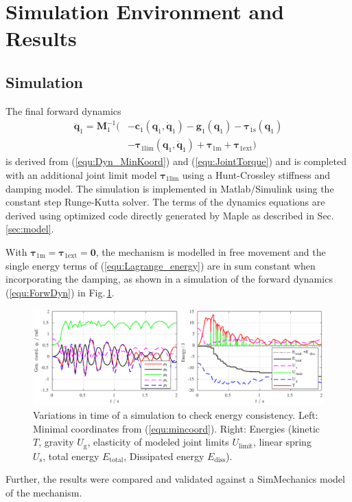 \documentclass[letterpaper, 10 pt, conference]{ieeeconf}  %
\newcommand{\bm}[1]{\boldsymbol{#1}}
\begin{document}
\section{Simulation Environment and Results}
\label{sec:simulation}

\subsection{Simulation}

The final forward dynamics
\begin{align}
\ddot{\bm{q}}_1 = \bm{M}_1^{-1}( &-\bm{c}_1(\bm{q}_1,\dot{\bm{q}}_1)-\bm{g}_1(\bm{q}_1) -\bm{\tau}_{1\mathrm{s}}(\bm{q}_1) \nonumber \\
& - \bm{\tau}_{1\mathrm{lim}}(\bm{q}_1,\dot{\bm{q}}_1)  + \bm{\tau}_{1\mathrm{m}} + \bm{\tau}_{1\mathrm{ext}})
\label{equ:ForwDyn}
\end{align}
is derived from (\ref{equ:Dyn_MinKoord}) and (\ref{equ:JointTorque}) and is completed with an additional joint limit model $\bm{\tau}_{1\mathrm{lim}}$ using a Hunt-Crossley stiffness and damping model.
The simulation is implemented in Matlab/Simulink using the constant step Runge-Kutta solver.
The terms of the dynamics equations are derived using optimized code directly generated by Maple as described in Sec.\,\ref{sec:model}.

With ${\bm{\tau}_{1\mathrm{m}} = \bm{\tau}_{1\mathrm{ext}} = \bm{0}}$, the mechanism is modelled in free movement and the single energy terms of (\ref{equ:Lagrange_energy}) are in sum constant when incorporating the damping, as shown in a simulation of the forward dynamics (\ref{equ:ForwDyn}) in Fig.\,\ref{fig:SimulationEnergiekonsistenz}.
%
\begin{figure}[htb!]
    \includegraphics{figures/KAS5m5_Gelenkgrenzmodell_q_E.pdf} 
    \vspace{-0.4cm}
    \caption{Variations in time of a simulation to check energy consistency. Left: Minimal coordinates from (\ref{equ:mincoord}). Right: Energies (kinetic $T$, gravity $U_\mathrm{g}$, elasticity of modeled joint limits $U_\mathrm{limit}$, linear spring $U_\mathrm{s}$, total energy $E_\mathrm{total}$, Dissipated energy $E_\mathrm{diss}$).}
    \label{fig:SimulationEnergiekonsistenz}
    \vspace{-0.2cm}
\end{figure}
%
Further, the results were compared and validated against a SimMechanics model of the mechanism.
\end{document}
